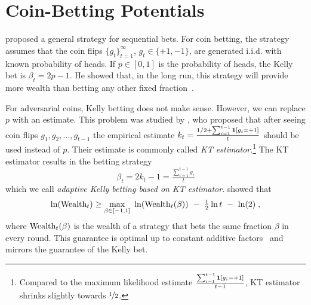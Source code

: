 \section{Coin-Betting Potentials}
\label{section:coin-betting-potentials}

\citet{Kelly-1956} proposed a general strategy for sequential bets. For coin
betting, the strategy assumes that the coin flips $\{g_t\}_{t=1}^\infty$, $g_t
\in \{+1,-1\}$, are generated i.i.d. with known probability of heads. If $p \in
[0,1]$ is the probability of heads, the Kelly bet is
$\beta_t = 2p - 1$.
He showed that, in the long run, this strategy will provide more wealth than betting any other fixed fraction~\cite{Kelly-1956}.

For adversarial coins, Kelly betting does not make sense. However, we can
replace $p$ with an estimate. This problem was studied by \citet{Krichevsky-Trofimov-1981},
who proposed that after seeing coin flips $g_1, g_2, \dots, g_{t-1}$ the
empirical estimate $k_t = \frac{1/2 + \sum_{i=1}^{t-1} \mathbf{1}[g_i = +1]}{t}$
should be used instead of $p$. Their estimate is commonly called \emph{KT
estimator}.\footnote{Compared to the maximum likelihood estimate
$\frac{\sum_{i=1}^{t-1} \mathbf{1}[g_i = +1]}{t-1}$, KT estimator shrinks
slightly towards $\nicefrac{1}{2}$.} The KT estimator results in the betting strategy
\begin{equation}
\label{equation:kt-estimator-betting-strategy}
\beta_t = 2k_t - 1 = \tfrac{\sum_{i=1}^{t-1} g_i}{t}
\end{equation}
which we call \emph{adaptive Kelly betting based on KT estimator}.
\citeauthor{Krichevsky-Trofimov-1981} showed that
\[
\ln(\Wealth_t) \ge \max_{\beta \in [-1,1]} \  \ln(\Wealth_t(\beta)) \ - \ \tfrac{1}{2} \ln t \ - \ \ln(2) \; ,
\]
where $\operatorname{Wealth}_t(\beta)$ is the wealth of a strategy that bets the same
fraction $\beta$ in every round. This guarantee is optimal up to constant
additive factors~\citep{Cesa-Bianchi-Lugosi-2006} and mirrors the guarantee of the Kelly bet.

